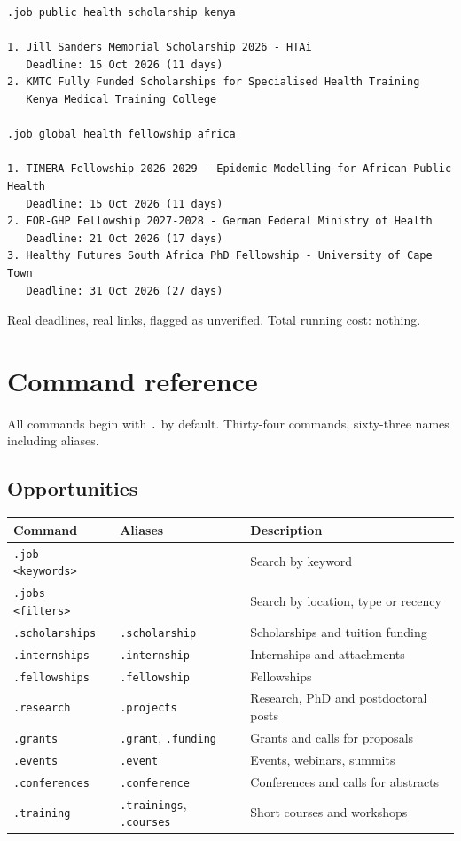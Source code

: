 \documentclass[11pt,a4paper]{report}
\begin{document}
\begin{lstlisting}
.job public health scholarship kenya

1. Jill Sanders Memorial Scholarship 2026 - HTAi
   Deadline: 15 Oct 2026 (11 days)
2. KMTC Fully Funded Scholarships for Specialised Health Training
   Kenya Medical Training College

.job global health fellowship africa

1. TIMERA Fellowship 2026-2029 - Epidemic Modelling for African Public Health
   Deadline: 15 Oct 2026 (11 days)
2. FOR-GHP Fellowship 2027-2028 - German Federal Ministry of Health
   Deadline: 21 Oct 2026 (17 days)
3. Healthy Futures South Africa PhD Fellowship - University of Cape Town
   Deadline: 31 Oct 2026 (27 days)
\end{lstlisting}

Real deadlines, real links, flagged as unverified. Total running cost: nothing.

\chapter{Command reference}

All commands begin with \texttt{.} by default. Thirty-four commands, sixty-three
names including aliases.

\section{Opportunities}

\begin{center}
\begin{tabularx}{\textwidth}{@{}llX@{}}
\toprule
\textbf{Command} & \textbf{Aliases} & \textbf{Description} \\
\midrule
\texttt{.job <keywords>} & & Search by keyword \\
\texttt{.jobs <filters>} & & Search by location, type or recency \\
\texttt{.scholarships} & \texttt{.scholarship} & Scholarships and tuition
funding \\
\texttt{.internships} & \texttt{.internship} & Internships and attachments \\
\texttt{.fellowships} & \texttt{.fellowship} & Fellowships \\
\texttt{.research} & \texttt{.projects} & Research, PhD and postdoctoral posts \\
\texttt{.grants} & \texttt{.grant}, \texttt{.funding} & Grants and calls for
proposals \\
\texttt{.events} & \texttt{.event} & Events, webinars, summits \\
\texttt{.conferences} & \texttt{.conference} & Conferences and calls for
abstracts \\
\texttt{.training} & \texttt{.trainings}, \texttt{.courses} & Short courses and
workshops \\
\bottomrule
\end{tabularx}
\end{center}
\end{document}
